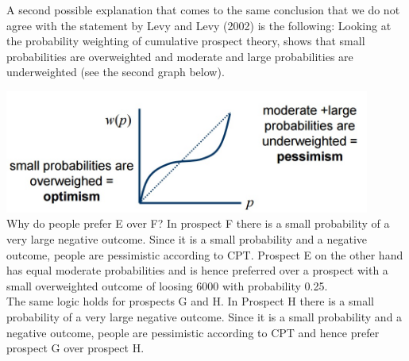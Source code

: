 \documentclass{article}
\begin{document}
A second possible explanation that comes to the same conclusion that we do not agree with
the statement by Levy and Levy (2002) is the following:
Looking at the probability weighting of cumulative prospect theory, shows that small
probabilities are overweighted and moderate and large probabilities are underweighted (see the second graph below). 

\includegraphics[width=12cm]{Graph2} \\

Why do people prefer E over F? In prospect F there is a small probability of a very large
negative outcome. Since it is a small probability and a negative outcome, people are
pessimistic according to CPT. Prospect E on the other hand has equal moderate probabilities
and is hence preferred over a prospect with a small overweighted outcome of loosing 6000
with probability 0.25. \\

The same logic holds for prospects G and H. In Prospect H there is a small probability of a
very large negative outcome. Since it is a small probability and a negative outcome, people
are pessimistic according to CPT and hence prefer prospect G over prospect H.
\end{document}
